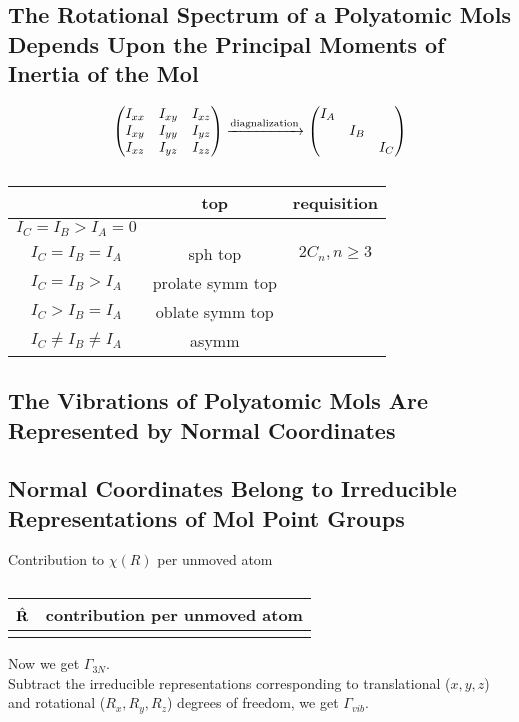 \documentclass[a4paper]{article}
\DeclareMathOperator{\hR}{\hat{\vb{R}}}
\numberwithin{equation}{section}
\begin{document}
\subsection{The Rotational Spectrum of a Polyatomic Mols Depends Upon the Principal Moments of Inertia of the Mol}
\begin{equation}\label{key}
\mqty(I_{xx} & I_{xy} & I_{xz}\\ I_{xy} & I_{yy} & I_{yz} \\ I_{xz} & I_{yz} & I_{zz}) \xrightarrow{\text{diagnalization}} \mqty(I_A && \\ & I_B &\\ && I_C)
\end{equation}
\begin{table}[H]
	\centering
	\begin{tabular}{ccc}
		\hline
		& top & requisition \\ \hline
		$ I_C = I_B > I_A = 0 $ &  & \\
		$ I_C = I_B = I_A $ & sph top & $ 2C_n, n\geq 3 $\\
		$ I_C = I_B > I_A $ & prolate symm top &\\
		$ I_C > I_B = I_A $ & oblate symm top & \\
		$ I_C \neq I_B \neq I_A $& asymm & \\
		\hline
	\end{tabular}
	\caption{}
\end{table}

\subsection{The Vibrations of Polyatomic Mols Are Represented by Normal Coordinates}

\subsection{Normal Coordinates Belong to Irreducible Representations of Mol Point Groups}
Contribution to $ \chi(R) $ per unmoved atom
\begin{table}[H]
	\centering
	\begin{tabular}{cc}
		\hline
		$ \hR $ & contribution per unmoved atom \\ \hline
		& \\
		\hline
	\end{tabular}
	\caption{}
\end{table}

Now we get $ \Gamma_{3N} $.\\
Subtract the irreducible representations corresponding to translational ($ x,y,z $) and rotational ($ R_x, R_y, R_z $) degrees of freedom, we get $ \Gamma_{vib} $.
\end{document}
